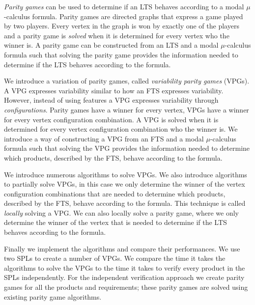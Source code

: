 \textit{Parity games} can be used to determine if an LTS behaves according to a modal $\mu$-calculus formula. Parity games are directed graphs that express a game played by two players. Every vertex in the graph is won by exactly one of the players and a parity game is \textit{solved} when it is determined for every vertex who the winner is. A parity game can be constructed from an LTS and a modal $\mu$-calculus formula such that solving the parity game provides the information needed to determine if the LTS behaves according to the formula.

We introduce a variation of parity games, called \textit{variability parity games} (VPGs). A VPG expresses variability similar to how an FTS expresses variability. However, instead of using features a VPG expresses variability through \textit{configurations}. Parity games have a winner for every vertex, VPGs have a winner for every vertex configuration combination. A VPG is solved when it is determined for every vertex configuration combination who the winner is. We introduce a way of constructing a VPG from an FTS and a modal $\mu$-calculus formula such that solving the VPG provides the information needed to determine which products, described by the FTS, behave according to the formula.

We introduce numerous algorithms to solve VPGs. We also introduce algorithms to partially solve VPGs, in this case we only determine the winner of the vertex configuration combinations that are needed to determine which products, described by the FTS, behave according to the formula. This technique is called \textit{locally} solving a VPG. We can also locally solve a parity game, where we only determine the winner of the vertex that is needed to determine if the LTS behaves according to the formula.

Finally we implement the algorithms and compare their performances. We use two SPLs to create a number of VPGs. We compare the time it takes the algorithms to solve the VPGs to the time it takes to verify every product in the SPLs independently. For the independent verification approach we create parity games for all the products and requirements; these parity games are solved using existing parity game algorithms.